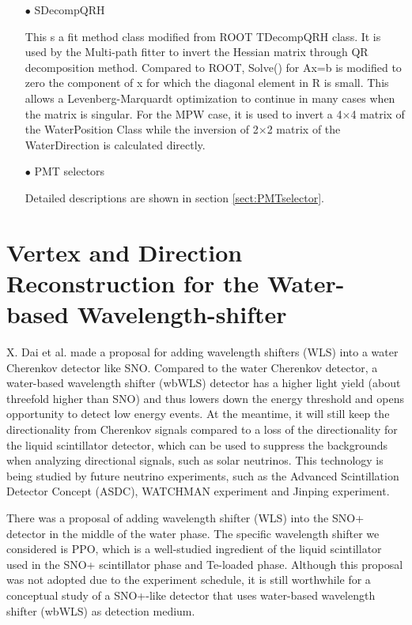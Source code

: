 \begin{itemize}
\item[$\bullet$] SDecompQRH

This s a fit method class modified from ROOT TDecompQRH class\cite{TDecompQRH}. It is used by the Multi-path fitter to invert the Hessian matrix through QR decomposition method\cite{press2007numerical}. Compared to ROOT, Solve() for Ax=b is modified to zero the component of x for which the diagonal element in R is small. This allows a Levenberg-Marquardt optimization to continue in many cases
when the matrix is singular. For the MPW case, it is used to invert a 4$\times$4 matrix of the WaterPosition Class while the inversion of 2$\times$2 matrix of the WaterDirection is calculated directly\cite{waterunidoc}.

\item[$\bullet$] PMT selectors

Detailed descriptions are shown in section \ref{sect:PMTselector}.

\end{itemize}

\section{Vertex and Direction Reconstruction for the Water-based Wavelength-shifter}
X. Dai et al.\cite{dai2008wavelength} made a proposal for adding wavelength shifters (WLS) into a water Cherenkov detector like SNO. Compared to the water Cherenkov detector, a water-based wavelength shifter (wbWLS) detector has a higher light yield (about threefold higher than SNO\cite{dai2008wavelength}) and thus lowers down the energy threshold and opens opportunity to detect low energy events. At the meantime, it will still keep the directionality from Cherenkov signals compared to a loss of the directionality for the liquid scintillator detector, which can be used to suppress the backgrounds when analyzing directional signals, such as solar neutrinos. This technology is being studied by future neutrino experiments, such as the Advanced Scintillation Detector Concept (ASDC)\cite{alonso2014advanced}, WATCHMAN experiment\cite{askins2015physics} and Jinping experiment\cite{beacom2017physics}.

There was a proposal of adding wavelength shifter (WLS) into the SNO+ detector in the middle of the water phase. The specific wavelength shifter we considered is PPO, which is a well-studied ingredient of the liquid scintillator used in the SNO+ scintillator phase and Te-loaded phase. Although this proposal was not adopted due to the experiment schedule, it is still worthwhile for a conceptual study of a SNO+-like detector that uses water-based wavelength shifter (wbWLS) as detection medium. 

